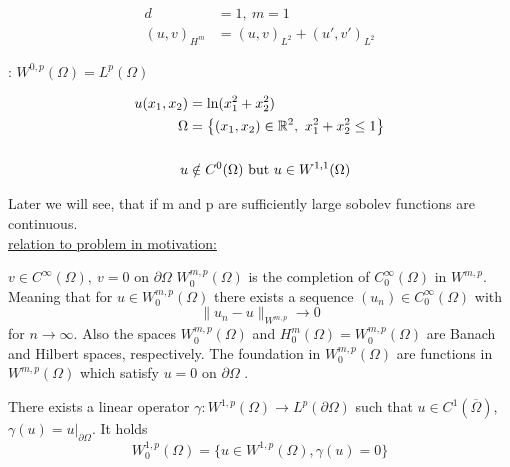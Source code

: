 \begin{example}
	\begin{align*}
		d&=1,\ m=1\\
		(u,v)_{H^m} &= (u,v)_{L^2} + (u',v')_{L^2}
	\end{align*} 
\end{example}

 
\begin{remark}: $W^{0,p}(\Omega) = L^p(\Omega)$\\
\end{remark}

\begin{example}
	\begin{align*}
	u(x_1,x_2) &= \text{ln}(x^2_1 + x^2_2)\\
	\Omega &= \big \{  (x_1,x_2)\in\mathbb{R}^2,\ x^2_1 + x^2_2 \leq 1    \big \} \\
	& \\
	u &\notin C^0(\Omega) \text{ but } u \in W^{1,1}(\Omega)
	\end{align*}
\end{example}
 
Later we will see, that if m and p are sufficiently large sobolev functions are continuous.\\
 
\underline{relation to problem in motivation:}\\

%
%
%
%
%

\par
\glqq $v \in C^\infty(\Omega),\ v=0 \text{ on } \partial\Omega$ \grqq \enter
$W^{m,p}_0(\Omega)$ is the completion of $C^\infty_0(\Omega)$ in $ W^{m,p} $. Meaning that for $u \in W^{m,p}_0(\Omega)$ there exists a sequence $(u_n) \in C^\infty_0(\Omega)$ with 
\begin{equation*}
	\|u_n - u\|_{W^{m,p}} \to 0
\end{equation*}
for $n \to \infty$.\enter
Also the spaces $W^{m,p}_0(\Omega)$ and $H^m_0(\Omega) = W^{m,p}_0(\Omega)$ are Banach and Hilbert spaces, respectively. The foundation in $W^{m,p}_0(\Omega)$ are functions in $W^{m,p}(\Omega)$ which satisfy \glqq $u =0$ on $\partial \Omega$ \grqq. \enter 
\par

There exists a linear operator $\gamma: W^{1,p}(\Omega) \to L^p(\partial\Omega)$ such that $u \in C^1(\overline{\Omega})$, $\gamma(u) = u|_{\partial \Omega}$. It holds 
\begin{equation*}
	W^{1,p}_0(\Omega) = \big \{ u \in W^{1,p}(\Omega), \gamma(u) = 0 \big \}
\end{equation*}

